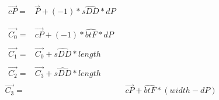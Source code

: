 

    \begin{align}
        \begin{split}\label{eq:1}
            \vec{cP} ={}& \vec{P} + (-1) * \hat{sDD} * dP
        \end{split}\\ \\
        \begin{split}\label{eq:2}
            \vec{C_0} ={}& \vec{cP} + (-1) * \hat{btF} * dP
        \end{split}\\
        \begin{split}\label{eq:3}
            \vec{C_1} ={}& \vec{C_0} + \hat{sDD} * length
        \end{split}\\
        \begin{split}\label{eq:4}
            \vec{C_2} ={}& \vec{C_3} + \hat{sDD} * length
        \end{split}\\
            \vec{C_3} ={}& \vec{cP} + \hat{btF} * (width - dP)\label{eq:5}
        \end{align}

